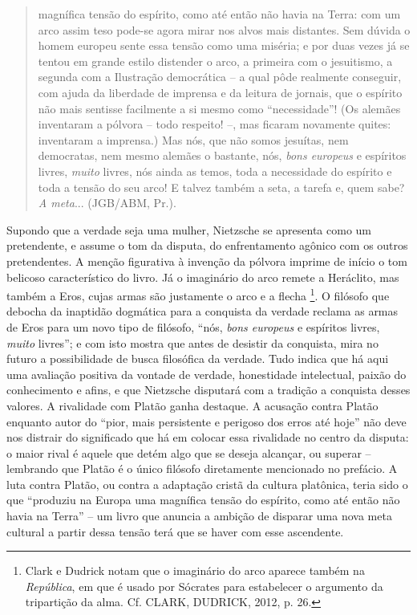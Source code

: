 \documentclass[
	12pt,				%
	openright,			%
	oneside,			%
	a4paper,			%
	english,			%
	french,				%
	spanish,			%
	brazil				%
	]{abntex2}
\begin{document}
\begin{quotation}
magnífica tensão do espírito, como até então não havia na Terra: com um arco assim teso pode-se agora mirar nos alvos mais distantes. Sem dúvida o homem europeu sente essa tensão como uma miséria; e por duas vezes já se tentou em grande estilo distender o arco, a primeira com o jesuitismo, a segunda com a Ilustração democrática – a qual pôde realmente conseguir, com ajuda da liberdade de imprensa e da leitura de jornais, que o espírito não mais sentisse facilmente a si mesmo como “necessidade”! (Os alemães inventaram a pólvora – todo respeito! –, mas ficaram novamente quites: inventaram a imprensa.) Mas nós, que não somos jesuítas, nem democratas, nem mesmo alemães o bastante, nós, \textit{bons europeus} e espíritos livres, \textit{muito} livres, nós ainda as temos, toda a necessidade do espírito e toda a tensão do seu arco! E talvez também a seta, a tarefa e, quem sabe? \textit{A meta}... (JGB/ABM, Pr.). 
\end{quotation}

Supondo que a verdade seja uma mulher, Nietzsche se apresenta como um pretendente, e  assume o tom da disputa, do enfrentamento agônico com os outros pretendentes. A menção figurativa à invenção da pólvora imprime de início o tom belicoso característico do livro. Já o imaginário do arco remete a Heráclito, mas também a Eros, cujas armas são justamente o arco e a flecha
\footnote{Clark e Dudrick notam que o imaginário do arco aparece também na \textit{República}, em que é usado por Sócrates para estabelecer o argumento da tripartição da alma. Cf. CLARK, DUDRICK, 2012, p. 26.}. 
O filósofo que debocha da inaptidão dogmática para a conquista da verdade reclama as armas de Eros para um novo tipo de filósofo, “nós, \textit{bons europeus} e espíritos livres, \textit{muito} livres”; e com isto mostra que antes de desistir da conquista, mira no futuro a possibilidade de busca filosófica da verdade. Tudo indica que há aqui uma avaliação positiva da vontade de verdade, honestidade intelectual, paixão do conhecimento e afins, e que Nietzsche disputará com a tradição a conquista desses valores. A rivalidade com Platão ganha destaque. A acusação contra Platão enquanto autor do “pior, mais persistente e perigoso dos erros até hoje” não deve nos distrair do significado que há em colocar essa rivalidade no centro da disputa: o maior rival é aquele que detém algo que se deseja alcançar, ou superar – lembrando que Platão é o único filósofo diretamente mencionado no prefácio. A luta contra Platão, ou contra a adaptação cristã da cultura platônica, teria sido o que “produziu na Europa uma magnífica tensão do espírito, como até então não havia na Terra” – um livro que anuncia a ambição de disparar uma nova meta cultural a partir dessa tensão terá que se haver com esse ascendente.
\end{document}
